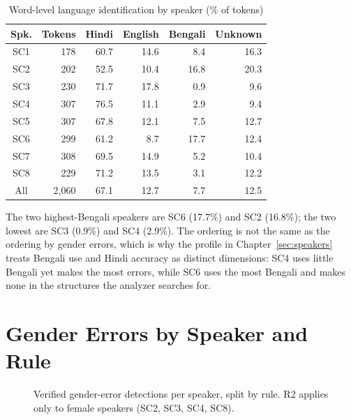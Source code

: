 \documentclass[11pt,a4paper]{report}
\begin{document}
\begin{table}[H]
\centering
\caption{Word-level language identification by speaker (\% of tokens)}
\label{tab:langdist}
\begin{tabular}{crrrrr}
\toprule
\textbf{Spk.} & \textbf{Tokens} & \textbf{Hindi} & \textbf{English} & \textbf{Bengali} & \textbf{Unknown} \\
\midrule
SC1 & 178 & 60.7 & 14.6 &  8.4 & 16.3 \\
SC2 & 202 & 52.5 & 10.4 & 16.8 & 20.3 \\
SC3 & 230 & 71.7 & 17.8 &  0.9 &  9.6 \\
SC4 & 307 & 76.5 & 11.1 &  2.9 &  9.4 \\
SC5 & 307 & 67.8 & 12.1 &  7.5 & 12.7 \\
SC6 & 299 & 61.2 &  8.7 & 17.7 & 12.4 \\
SC7 & 308 & 69.5 & 14.9 &  5.2 & 10.4 \\
SC8 & 229 & 71.2 & 13.5 &  3.1 & 12.2 \\
\midrule
All & 2,060 & 67.1 & 12.7 & 7.7 & 12.5 \\
\bottomrule
\end{tabular}
\end{table}


The two highest-Bengali speakers are SC6 (17.7\%) and SC2 (16.8\%); the two lowest are SC3 (0.9\%) and SC4 (2.9\%). The ordering is not the same as the ordering by gender errors, which is why the profile in Chapter~\ref{sec:speakers} treats Bengali use and Hindi accuracy as distinct dimensions: SC4 uses little Bengali yet makes the most errors, while SC6 uses the most Bengali and makes none in the structures the analyzer searches for.

\section{Gender Errors by Speaker and Rule}

\begin{figure}[H]
\centering
{}
\caption{Verified gender-error detections per speaker, split by rule. R2 applies only to female speakers (SC2, SC3, SC4, SC8).}
\label{fig:ge}
\end{figure}
\end{document}
